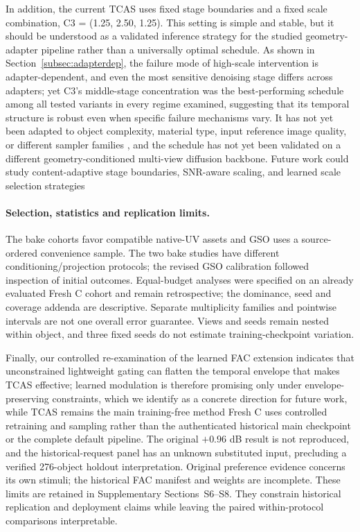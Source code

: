 \documentclass[times,twocolumn,final]{elsarticle}
\providecommand{\DIFadd}[1]{{\protect\color{blue} \sf #1}} %
\providecommand{\DIFdel}[1]{{\protect\color{red} \scriptsize #1}} %
\providecommand{\DIFaddbegin}{} %
\providecommand{\DIFaddend}{} %
\providecommand{\DIFdelbegin}{} %
\providecommand{\DIFdelend}{} %
\begin{document}
\DIFdelbegin \DIFdel{In addition, the current TCAS uses fixed stage boundaries and a fixed scale combination, C3 = (1.25, 2.50, 1.25). This setting is simple and stable, but it should be understood as a validated inference strategy for the studied geometry-adapter pipeline rather than a universally optimal schedule.
As shown in Section~\ref{subsec:adapterdep}, the failure mode of high-scale intervention is adapter-dependent, and even the most sensitive denoising stage differs across adapters; yet C3's middle-stage concentration was the best-performing schedule among all tested variants in every regime examined, suggesting that its temporal structure is robust even when specific failure mechanisms vary. It has not yet been adapted to object complexity, material type, input reference image quality, or different sampler families , and the schedule has not yet been validated on a different geometry-conditioned multi-view diffusion backbone. Future work could study content-adaptive stage boundaries, SNR-aware scaling, and learned scale selection strategies}\DIFdelend \DIFaddbegin \paragraph{Selection, statistics and replication limits.}
\DIFadd{The bake cohorts favor compatible native-UV assets and GSO uses a source-ordered convenience sample. The two bake studies have different conditioning/projection protocols; the revised GSO calibration followed inspection of initial outcomes. Equal-budget analyses were specified on an already evaluated Fresh C cohort and remain retrospective; the dominance, seed and coverage addenda are descriptive. Separate multiplicity families and pointwise intervals are not one overall error guarantee. Views and seeds remain nested within object, and three fixed seeds do not estimate training-checkpoint variation}\DIFaddend .

\DIFdelbegin \DIFdel{Finally, our controlled re-examination of the learned FAC extension indicates that unconstrained lightweight gating can flatten the temporal envelope that makes TCAS effective; learned modulation is therefore promising only under envelope-preserving constraints, which we identify as a concrete direction for future work, while TCAS remains the main training-free method}\DIFdelend \DIFaddbegin \DIFadd{Fresh C uses controlled retraining and sampling rather than the authenticated historical main checkpoint or the complete default pipeline. The original $+0.96$ dB result is not reproduced, and the historical-request panel has an unknown substituted input, precluding a verified 276-object holdout interpretation. Original preference evidence concerns its own stimuli; the historical FAC manifest and weights are incomplete. These limits are retained in Supplementary Sections~S6--S8. They constrain historical replication and deployment claims while leaving the paired within-protocol comparisons interpretable}\DIFaddend .
\end{document}
